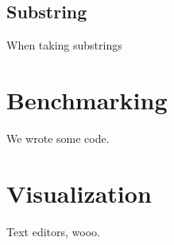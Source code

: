 \documentclass[12pt]{article}
\begin{document}
\subsection{Substring}

When taking substrings 

\section{Benchmarking}

We wrote some code.

\section{Visualization}

Text editors, wooo.
\end{document}
